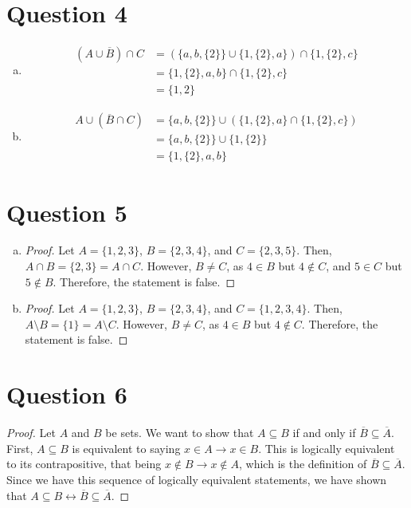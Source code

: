 \documentclass{article}
\begin{document}
\section*{Question 4}
\begin{enumerate}[(a)]
    \item
    \begin{align*}(A \cup \overline{B}) \cap C &= (\{a, b, \{2\}\} \cup \{1, \{2\}, a \}) \cap \{1, \{2\}, c\} \\
        &= \{1, \{2\}, a, b\} \cap \{1, \{2\}, c\} \\
        &= \{1, 2\}
    \end{align*}
    \item
    \begin{align*}
        A \cup (\overline{B} \cap C) &= \{a, b, \{2\}\} \cup (\{1, \{2\}, a\} \cap \{1, \{2\}, c\}) \\
        &= \{a, b, \{2\}\} \cup \{1, \{2\}\} \\
        &= \{1, \{2\}, a, b\}
    \end{align*}
\end{enumerate}

\section*{Question 5}
\renewcommand*{\proofname}{Disproof}
\begin{enumerate}[(a)]
    \item
        \begin{proof}
            Let $A = \{1, 2, 3\}$, $B = \{2, 3, 4\}$, and $C = \{2, 3, 5\}$.
            Then, $A \cap B = \{2, 3\} = A \cap C$.
            However, $B \neq C$, as $4 \in B$ but $4 \notin C$, and $5 \in C$ but $5 \notin B$.
            Therefore, the statement is false.
        \end{proof}
    \item
        \begin{proof}
            Let $A = \{1, 2, 3\}$, $B = \{2, 3, 4\}$, and $C = \{1, 2, 3, 4\}$.
            Then, $A \setminus B = \{1\} = A \setminus C$.
            However, $B \neq C$, as $4 \in B$ but $4 \notin C$.
            Therefore, the statement is false.
        \end{proof}
\end{enumerate}

\section*{Question 6}
\renewcommand*{\proofname}{Proof}
\begin{proof}
    Let $A$ and $B$ be sets. We want to show that $A \subseteq B$ if and only if $\overline{B} \subseteq \overline{A}$.
    First, $A \subseteq B$ is equivalent to saying $x \in A \rightarrow x \in B$.
    This is logically equivalent to its contrapositive, that being $x \notin B \rightarrow x \notin A$, which is the definition of $\overline{B} \subseteq \overline{A}$.
    Since we have this sequence of logically equivalent statements, we have shown that $A \subseteq B \leftrightarrow \overline{B} \subseteq \overline{A}$.
\end{proof}
\end{document}
